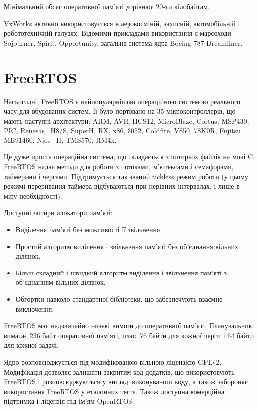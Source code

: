 \documentclass[oneside,14pt,a4paper,final]{extreport}
\begin{document}
Мінімальний обсяг оперативної пам'яті дорівнює 20-ти кілобайтам.

VxWorks активно використовується в аерокосміній, захисній, автомобільній і робототехнічній галузях. Відомими прикладами використання є марсоходи Sojourner, Spirit, Opportunity\cite{vxworks:rovers}, загальна система ядра Boeing 787 Dreamliner\cite{vxworks:boeing}.

\section{FreeRTOS}

Насьогодні, FreeRTOS\cite{freertos} є найпопулярнішою операційною системою реального часу для вбудованих систем\cite{freertos:popular}. Її було портовано на 35 мікроконтроллерів, що мають наступні архітектури: ARM, AVR, HCS12, MicroBlaze, Cortus, MSP430, PIC, Renesas~ H8/S, SuperH, RX, x86, 8052, Coldfire, V850, 78K0R, Fujitsu MB91460, Nios~ II, TMS570, RM4x.

Це дуже проста операційна система, що складається з чотирьох файлів на мові C. FreeRTOS надає методи для роботи з потоками, м'ютексами і семафорами, таймерами і чергами. Підтримується так званий tickless режим роботи (у цьому режимі переривання таймера відбуваються при нерівних інтервалах, і лише в міру необхідності).

Доступні чотири алокатори пам'яті:
\begin{itemize}
  \item Виділення пам'яті без можливості її звільнення.
  \item Простий алгоритм виділення і звільнення пам'яті без об'єднання вільних ділянок.
  \item Більш складний і швидкий алгоритм виділення і звільнення пам'яті з об'єднанням вільних ділянок.
  \item Обгортки навколо стандартної бібліотеки, що забезпечують взаємне виключення.
\end{itemize}

FreeRTOS має надзвичайно низькі вимоги до оперативної пам'яті. Планувальник вимагає 236 байт оперативної пам'яті, плюс 76 байти для кожної черги і 64 байти для кожної задачі.

Ядро розповсюджується під модифікованою вільною ліцензією GPLv2\cite{freertos:license}. Модифікація дозволяє залишати закритим код додатків, що використовують FreeRTOS і розповсюджуються у вигляді виконуваного коду, а також забороняє використання FreeRTOS у еталонних теста. Також доступна комерційна підтримка і ліцензія під ім'ям OpenRTOS\cite{openrtos}.
\end{document}
